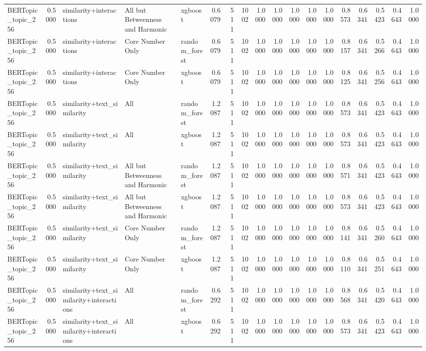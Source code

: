 \begin{tabular}{lrlllrrrrrrrrrrrrr}
BERTopic_topic_256 & 0.5000 & similarity+interactions & All but Betweenness and Harmonic & xgboost & 0.6079 & 511 & 1002 & 1.0000 & 1.0000 & 1.0000 & 1.0000 & 1.0000 & 0.8573 & 0.6341 & 0.5423 & 0.4643 & 1.0000 \\
BERTopic_topic_256 & 0.5000 & similarity+interactions & Core Number Only & random_forest & 0.6079 & 511 & 1002 & 1.0000 & 1.0000 & 1.0000 & 1.0000 & 1.0000 & 0.8157 & 0.6341 & 0.5266 & 0.4643 & 1.0000 \\
BERTopic_topic_256 & 0.5000 & similarity+interactions & Core Number Only & xgboost & 0.6079 & 511 & 1002 & 1.0000 & 1.0000 & 1.0000 & 1.0000 & 1.0000 & 0.8125 & 0.6341 & 0.5256 & 0.4643 & 1.0000 \\
BERTopic_topic_256 & 0.5000 & similarity+text_similarity & All & random_forest & 1.2087 & 511 & 1002 & 1.0000 & 1.0000 & 1.0000 & 1.0000 & 1.0000 & 0.8573 & 0.6341 & 0.5423 & 0.4643 & 1.0000 \\
BERTopic_topic_256 & 0.5000 & similarity+text_similarity & All & xgboost & 1.2087 & 511 & 1002 & 1.0000 & 1.0000 & 1.0000 & 1.0000 & 1.0000 & 0.8573 & 0.6341 & 0.5423 & 0.4643 & 1.0000 \\
BERTopic_topic_256 & 0.5000 & similarity+text_similarity & All but Betweenness and Harmonic & random_forest & 1.2087 & 511 & 1002 & 1.0000 & 1.0000 & 1.0000 & 1.0000 & 1.0000 & 0.8571 & 0.6341 & 0.5423 & 0.4643 & 1.0000 \\
BERTopic_topic_256 & 0.5000 & similarity+text_similarity & All but Betweenness and Harmonic & xgboost & 1.2087 & 511 & 1002 & 1.0000 & 1.0000 & 1.0000 & 1.0000 & 1.0000 & 0.8573 & 0.6341 & 0.5423 & 0.4643 & 1.0000 \\
BERTopic_topic_256 & 0.5000 & similarity+text_similarity & Core Number Only & random_forest & 1.2087 & 511 & 1002 & 1.0000 & 1.0000 & 1.0000 & 1.0000 & 1.0000 & 0.8141 & 0.6341 & 0.5260 & 0.4643 & 1.0000 \\
BERTopic_topic_256 & 0.5000 & similarity+text_similarity & Core Number Only & xgboost & 1.2087 & 511 & 1002 & 1.0000 & 1.0000 & 1.0000 & 1.0000 & 1.0000 & 0.8110 & 0.6341 & 0.5251 & 0.4643 & 1.0000 \\
BERTopic_topic_256 & 0.5000 & similarity+text_similarity+interactions & All & random_forest & 0.6292 & 511 & 1002 & 1.0000 & 1.0000 & 1.0000 & 1.0000 & 1.0000 & 0.8568 & 0.6341 & 0.5420 & 0.4643 & 1.0000 \\
BERTopic_topic_256 & 0.5000 & similarity+text_similarity+interactions & All & xgboost & 0.6292 & 511 & 1002 & 1.0000 & 1.0000 & 1.0000 & 1.0000 & 1.0000 & 0.8573 & 0.6341 & 0.5423 & 0.4643 & 1.0000 \\

\end{tabular}
